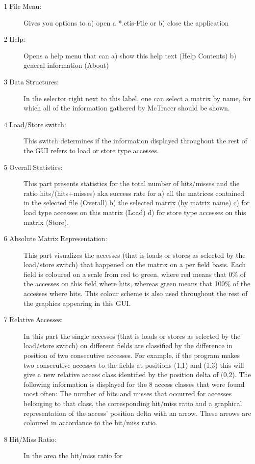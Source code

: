 \begin{description}
\item [{1$\;$File$\;$Menu:}] Gives you options to a) open a {*}.etis-File
or b) close the application
\item [{2$\;$Help:}] Opens a help menu that can a) show this help text
(Help Contents) b) general information (About)
\item [{3$\;$Data$\;$Structures:}] In the selector right next to this
label, one can select a matrix by name, for which all of the information
gathered by McTracer should be shown.
\item [{4$\;$Load/Store$\;$switch:}] This switch 
determines if the information displayed throughout
the rest of the GUI refers to load or store type accesses.
\item [{5$\;$Overall$\;$Statistics:}] This part presents statistics for
the total number of hits/misses and the ratio hits/(hits+misses) aka
success rate for a) all the matrices contained in the selected file
(Overall) b) the selected matrix (by matrix name) c) for load type
accesses on this matrix (Load) d) for store type accesses on this
matrix (Store).
\item [{6$\;$Absolute$\;$Matrix$\;$Representation:}] This part visualizes
the accesses (that is loads or stores as selected by the load/store
switch) that happened on the matrix on a per field basis. Each field
is coloured on a scale from red to green, where red means that 0\%
of the accesses on this field where hits, whereas green means that
100\% of the accesses where hits. This colour scheme is also used
throughout the rest of the graphics appearing in this GUI.
\item [{7$\;$Relative$\;$Accesses:}] In this part the single accesses
(that is loads or stores as selected by the load/store switch) on
different fields are classified by the difference in position of two
consecutive accesses. For example, if the program makes two consecutive
accesses to the fields at positions (1,1) and (1,3) this will give
a new relative access class identified by the position delta of (0,2).
The following information is displayed for the 8 access classes that
were found most often: The number of hits and misses that occurred
for accesses belonging to that class, the corresponding hit/miss ratio
and a graphical representation of the access' position delta with
an arrow. These arrows are coloured in accordance to the hit/miss
ratio. 
\item [{8$\;$Hit/Miss$\;$Ratio:}] In the area the hit/miss ratio for

\end{description}

